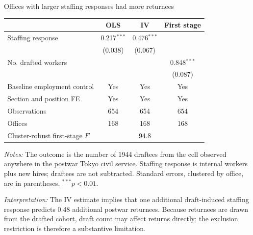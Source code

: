 \documentclass[aspectratio=169]{beamer}
\begin{document}
\begin{frame}{Offices with larger staffing responses had more returnees}
  \centering
  \small
  \begin{threeparttable}
    \begin{tabular}{lccc}
      \toprule
      & OLS & IV & First stage \\
      \midrule
      Staffing response
        & 0.217$^{***}$ & 0.476$^{***}$ & \\
        & (0.038) & (0.067) & \\
      No. drafted workers
        & & & 0.848$^{***}$ \\
        & & & (0.087) \\
      \midrule
      Baseline employment control & Yes & Yes & Yes \\
      Section and position FE & Yes & Yes & Yes \\
      Observations & 654 & 654 & 654 \\
      Offices & 168 & 168 & 168 \\
      Cluster-robust first-stage $F$ & & 94.8 & \\
      \bottomrule
    \end{tabular}
    \begin{tablenotes}[flushleft]
      \tiny
      \item \textit{Notes:} The outcome is the number of 1944 draftees from the
      cell observed anywhere in the postwar Tokyo civil service. Staffing
      response is internal workers plus new hires; draftees are not subtracted.
      Standard errors, clustered by office, are in parentheses. $^{***}p<0.01$.
      \item \textit{Interpretation:} The IV estimate implies that one additional
      draft-induced staffing response predicts 0.48 additional postwar
      returnees. Because returnees are drawn from the drafted cohort, draft
      count may affect returns directly; the exclusion restriction is therefore
      a substantive limitation.
    \end{tablenotes}
  \end{threeparttable}
\end{frame}
\end{document}
